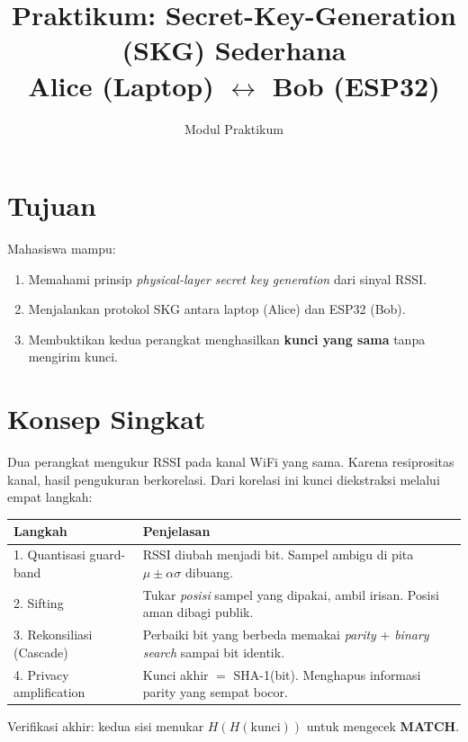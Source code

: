 \documentclass[11pt,a4paper]{article}
\title{\textbf{Praktikum: Secret-Key-Generation (SKG) Sederhana\\ Alice (Laptop) $\leftrightarrow$ Bob (ESP32)}}
\author{Modul Praktikum}
\date{}
\begin{document}
\maketitle

\section{Tujuan}
Mahasiswa mampu:
\begin{enumerate}[noitemsep]
  \item Memahami prinsip \emph{physical-layer secret key generation} dari sinyal RSSI.
  \item Menjalankan protokol SKG antara laptop (Alice) dan ESP32 (Bob).
  \item Membuktikan kedua perangkat menghasilkan \textbf{kunci yang sama} tanpa mengirim kunci.
\end{enumerate}

\section{Konsep Singkat}
Dua perangkat mengukur RSSI pada kanal WiFi yang sama. Karena resiprositas kanal, hasil
pengukuran berkorelasi. Dari korelasi ini kunci diekstraksi melalui empat langkah:

\begin{longtable}{p{3.2cm} p{10.5cm}}
\toprule
\textbf{Langkah} & \textbf{Penjelasan} \\
\midrule
1. Quantisasi guard-band & RSSI diubah menjadi bit. Sampel ambigu di pita $\mu \pm \alpha\sigma$ dibuang. \\
2. Sifting & Tukar \emph{posisi} sampel yang dipakai, ambil irisan. Posisi aman dibagi publik. \\
3. Rekonsiliasi (Cascade) & Perbaiki bit yang berbeda memakai \emph{parity} + \emph{binary search} sampai bit identik. \\
4. Privacy amplification & Kunci akhir $=$ SHA-1(bit). Menghapus informasi parity yang sempat bocor. \\
\bottomrule
\end{longtable}

\noindent Verifikasi akhir: kedua sisi menukar $H(H(\text{kunci}))$ untuk mengecek \textbf{MATCH}.
\end{document}

